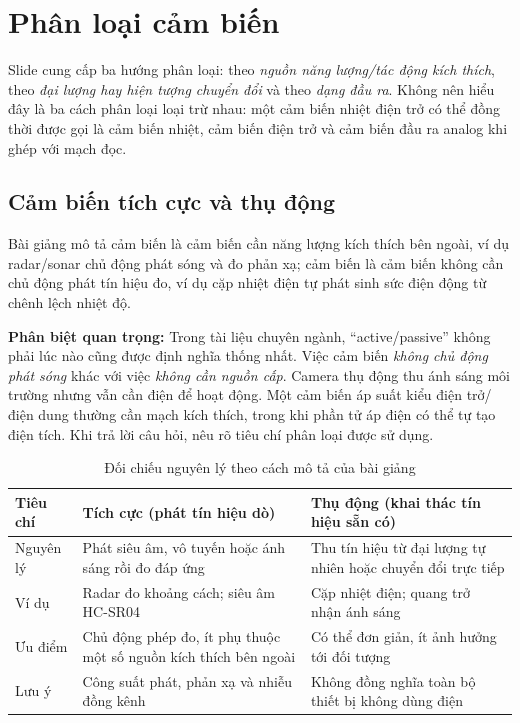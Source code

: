 \section{Phân loại cảm biến}
Slide cung cấp ba hướng phân loại: theo \emph{nguồn năng lượng/tác động kích thích}, theo \emph{đại lượng hay hiện tượng chuyển đổi} và theo \emph{dạng đầu ra}. Không nên hiểu đây là ba cách phân loại loại trừ nhau: một cảm biến nhiệt điện trở có thể đồng thời được gọi là cảm biến nhiệt, cảm biến điện trở và cảm biến đầu ra analog khi ghép với mạch đọc.

\subsection{Cảm biến tích cực và thụ động}
Bài giảng mô tả cảm biến  là cảm biến cần năng lượng kích thích bên ngoài, ví dụ radar/sonar chủ động phát sóng và đo phản xạ; cảm biến  là cảm biến không cần chủ động phát tín hiệu đo, ví dụ cặp nhiệt điện tự phát sinh sức điện động từ chênh lệch nhiệt độ.

\begin{notebox}
\textbf{Phân biệt quan trọng:} Trong tài liệu chuyên ngành, ``active/passive'' không phải lúc nào cũng được định nghĩa thống nhất. Việc cảm biến \emph{không chủ động phát sóng} khác với việc \emph{không cần nguồn cấp}. Camera thụ động thu ánh sáng môi trường nhưng vẫn cần điện để hoạt động. Một cảm biến áp suất kiểu điện trở/điện dung thường cần mạch kích thích, trong khi phần tử áp điện có thể tự tạo điện tích. Khi trả lời câu hỏi, nêu rõ tiêu chí phân loại được sử dụng.
\end{notebox}

\begin{table}[htbp]\centering\small
\caption{Đối chiếu nguyên lý theo cách mô tả của bài giảng}
\begin{tabularx}{\textwidth}{p{31mm}XX}
\toprule
Tiêu chí & Tích cực (phát tín hiệu dò) & Thụ động (khai thác tín hiệu sẵn có)\\\midrule
Nguyên lý & Phát siêu âm, vô tuyến hoặc ánh sáng rồi đo đáp ứng & Thu tín hiệu từ đại lượng tự nhiên hoặc chuyển đổi trực tiếp\\
Ví dụ & Radar đo khoảng cách; siêu âm HC-SR04 & Cặp nhiệt điện; quang trở nhận ánh sáng\\
Ưu điểm & Chủ động phép đo, ít phụ thuộc một số nguồn kích thích bên ngoài & Có thể đơn giản, ít ảnh hưởng tới đối tượng\\
Lưu ý & Công suất phát, phản xạ và nhiễu đồng kênh & Không đồng nghĩa toàn bộ thiết bị không dùng điện\\\bottomrule
\end{tabularx}
\end{table}

